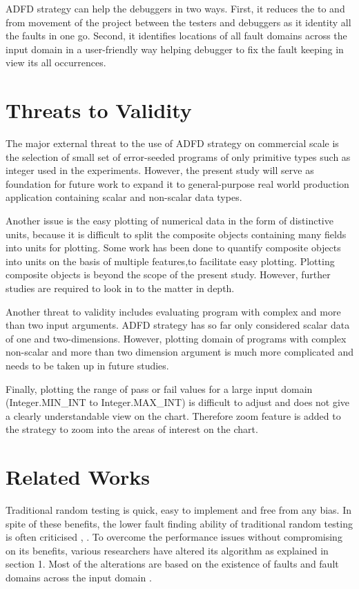 ADFD strategy can help the debuggers in two ways. First, it reduces the to and from movement of the project between the testers and debuggers as it identity all the faults in one go. Second, it identifies locations of all fault domains across the input domain in a user-friendly way helping debugger to fix the fault keeping in view its all occurrences.


\section{Threats to Validity} \label{sec:validity}
The major external threat to the use of ADFD strategy on commercial scale is the selection of small set of error-seeded programs of only primitive types such as integer used in the experiments. However, the present study will serve as foundation for future work to expand it to general-purpose real world production application containing scalar and non-scalar data types.

Another issue is the easy plotting of numerical data in the form of distinctive units, because it is difficult to split the composite objects containing many fields into units for plotting. Some work has been done to quantify composite objects into units on the basis of multiple features\cite{Ciupa2006},to facilitate easy plotting. Plotting composite objects is beyond the scope of the present study. However, further studies are required to look in to the matter in depth. 

Another threat to validity includes evaluating program with complex and more than two input arguments. ADFD strategy has so far only considered scalar data of one and two-dimensions. However, plotting domain of programs with complex non-scalar and more than two dimension argument is much more complicated and needs to be taken up in future studies.

Finally, plotting the range of pass or fail values for a large input domain (Integer.MIN\_INT to Integer.MAX\_INT) is difficult to adjust and does not give a clearly understandable view on the chart. Therefore zoom feature is added to the strategy to zoom into the areas of interest on the chart.



\section{Related Works} \label{sec:relatedWork}
Traditional random testing is quick, easy to implement and free from any bias. In spite of these benefits, the lower fault finding ability of traditional random testing is often criticised \cite{Offutt1996}, \cite{Myers2011}. To overcome the performance issues without compromising on its benefits, various researchers have altered its algorithm as explained in section 1. Most of the alterations are based on the existence of faults and fault domains across the input domain \cite{Chan1996}. 

